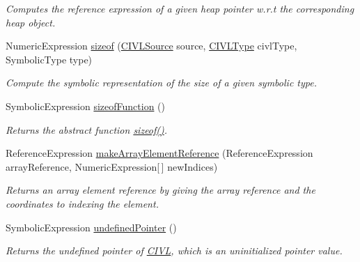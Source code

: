 \begin{DoxyCompactItemize}
\begin{DoxyCompactList}\small\item\em Computes the reference expression of a given heap pointer w.\+r.\+t the corresponding heap object. \end{DoxyCompactList}\item 
Numeric\+Expression \hyperlink{interfaceedu_1_1udel_1_1cis_1_1vsl_1_1civl_1_1dynamic_1_1IF_1_1SymbolicUtility_a406796da0190363471a6918d0e863afa}{sizeof} (\hyperlink{interfaceedu_1_1udel_1_1cis_1_1vsl_1_1civl_1_1model_1_1IF_1_1CIVLSource}{C\+I\+V\+L\+Source} source, \hyperlink{interfaceedu_1_1udel_1_1cis_1_1vsl_1_1civl_1_1model_1_1IF_1_1type_1_1CIVLType}{C\+I\+V\+L\+Type} civl\+Type, Symbolic\+Type type)
\begin{DoxyCompactList}\small\item\em Compute the symbolic representation of the size of a given symbolic type. \end{DoxyCompactList}\item 
Symbolic\+Expression \hyperlink{interfaceedu_1_1udel_1_1cis_1_1vsl_1_1civl_1_1dynamic_1_1IF_1_1SymbolicUtility_a9f9938e9d9edbecd960a01c5d54a9cd8}{sizeof\+Function} ()
\begin{DoxyCompactList}\small\item\em Returns the abstract function {\ttfamily \hyperlink{interfaceedu_1_1udel_1_1cis_1_1vsl_1_1civl_1_1dynamic_1_1IF_1_1SymbolicUtility_a406796da0190363471a6918d0e863afa}{sizeof()}}. \end{DoxyCompactList}\item 
Reference\+Expression \hyperlink{interfaceedu_1_1udel_1_1cis_1_1vsl_1_1civl_1_1dynamic_1_1IF_1_1SymbolicUtility_a32dd8635690fdd07a27ce72550d3557a}{make\+Array\+Element\+Reference} (Reference\+Expression array\+Reference, Numeric\+Expression\mbox{[}$\,$\mbox{]} new\+Indices)
\begin{DoxyCompactList}\small\item\em Returns an array element reference by giving the array reference and the coordinates to indexing the element. \end{DoxyCompactList}\item 
Symbolic\+Expression \hyperlink{interfaceedu_1_1udel_1_1cis_1_1vsl_1_1civl_1_1dynamic_1_1IF_1_1SymbolicUtility_a18d94e4f52d8d13f10973781a0dfa9e9}{undefined\+Pointer} ()
\begin{DoxyCompactList}\small\item\em Returns the undefined pointer of \hyperlink{classedu_1_1udel_1_1cis_1_1vsl_1_1civl_1_1CIVL}{C\+I\+V\+L}, which is an uninitialized pointer value. \end{DoxyCompactList}\item 

\end{DoxyCompactItemize}
